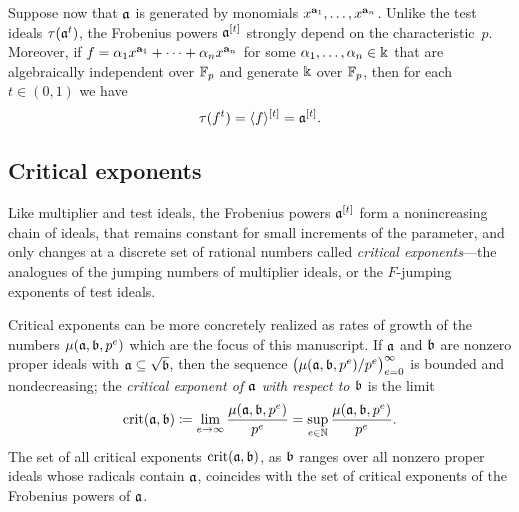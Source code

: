 \documentclass{amsart}
\begin{document}
Suppose now that $\mathfrak{a}$ is generated by monomials $x^{\mathbf{a}_1},\ldots,x^{\mathbf{a}_n}$.
Unlike the test ideals $\tau(\mathfrak{a}^t)$, the Frobenius powers $\mathfrak{a}^{[t]}$ strongly depend on the characteristic~$p$.
Moreover, if $f=\alpha_1x^{\mathbf{a}_1}+\cdots+\alpha_nx^{\mathbf{a}_n}$ for some $\alpha_1,\ldots,\alpha_n \in \Bbbk$ that are algebraically independent over $\mathbb{F}_p$ and generate $\Bbbk$ over $\mathbb{F}_p$, then for each $t \in (0,1)$ we have
\[\tau(f^t) = \langle f \rangle^{[t]} = \mathfrak{a}^{[t]}.\]

\subsection{Critical exponents}

Like multiplier and test ideals, the Frobenius powers $\mathfrak{a}^{[t]}$ form a nonincreasing chain of ideals, that remains constant for small increments of the parameter, and only changes at a discrete set of rational numbers called \emph{critical exponents}---the analogues of the jumping numbers of multiplier ideals, or the $F$-jumping exponents of test ideals.

Critical exponents can be more concretely realized as rates of growth of the numbers $\mu(\mathfrak{a},\mathfrak{b},p^e)$ which are the focus of this manuscript.
If $\mathfrak{a}$ and $\mathfrak{b}$ are nonzero proper ideals with $\mathfrak{a} \subseteq \sqrt {\mathfrak{b}}$, then the sequence $\big(\mu(\mathfrak{a},\mathfrak{b},p^e)/p^e\big)_{e=0}^\infty$ is bounded and nondecreasing; the \emph{critical exponent of $\mathfrak{a}$ with respect to $\mathfrak{b}$} is the limit
\[
   \operatorname{crit}(\mathfrak{a},\mathfrak{b}) \coloneqq \lim_{e\to \infty} \frac{\mu(\mathfrak{a},\mathfrak{b},p^e)}{p^e}
   = \sup_{e\in \mathbb{N}} \frac{\mu(\mathfrak{a},\mathfrak{b},p^e)}{p^e}.
\]
The set of all critical exponents $\operatorname{crit}(\mathfrak{a},\mathfrak{b})$, as $\mathfrak{b}$ ranges over all nonzero proper ideals whose radicals contain $\mathfrak{a}$, coincides with the set of critical exponents of the Frobenius powers of $\mathfrak{a}$.
\end{document}
